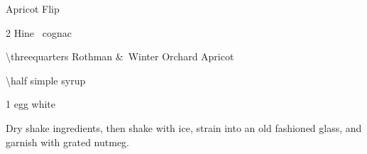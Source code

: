 \begin{PDTCocktail}{Apricot Flip}
	\begin{Ingredients}
	\item \SI{2}{\oz} Hine \vsop\ cognac
	\item \SI{\threequarters}{\oz} Rothman \&\ Winter Orchard Apricot
	\item \SI{\half}{\oz} simple syrup
	\item 1 egg white
	\end{Ingredients}
	
	\begin{Instructions}
	Dry shake ingredients, then shake with ice, strain into an old fashioned glass, and garnish with grated nutmeg.
	\end{Instructions}
\end{PDTCocktail}